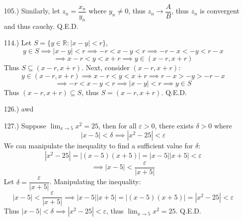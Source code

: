 \documentclass[12pt]{article}
\newcommand{\vertb}[1]{\left\vert#1\right\vert}
\newcommand{\e}{\varepsilon}
\newcommand{\lm}[1]{\displaystyle\lim_{#1}}
\begin{document}
\begin{itemize}
    \item [105.)] Similarly, let $z_n=\dfrac{x_n}{y_n}$ where $y_n\neq0$, thus $z_n\to\dfrac{A}{B}$, thus $z_n$ is convergent and thus cauchy. Q.E.D.








    \item [114.)] Let $S=\{y\in\mathbb{R}:\vertb{x-y}<r\}$,
    \[y\in S\implies\vertb{x-y}<r\implies-r<x-y<r\implies -r-x<-y<r-x\]
    \[\implies x-r<y<x+r\implies y\in(x-r,x+r)\]
    Thus $S\subseteq(x-r,x+r)$. Next, consider $(x-r,x+r)$:
    \[y\in(x-r,x+r)\implies x-r<y<x+r\implies r-x>-y>-r-x\]
    \[\implies -r<x-y<r\implies\vertb{x-y}<r\implies y\in S\]
    Thus $(x-r,x+r)\subseteq S$, thus $S=(x-r,x+r)$. Q.E.D.







    \pagebreak
    \item [126.)] awd

    \item [127.)] Suppose $\lm{x\to5}x^2=25$, then for all $\e>0$, there exists $\delta>0$ where
    \[\vertb{x-5}<\delta\implies\vertb{x^2-25}<\e\]
    We can manipulate the inequality to find a sufficient value for $\delta$:
    \[\vertb{x^2-25}=\vertb{(x-5)(x+5)}=\vertb{x-5}\vertb{x+5}<\e\]
    \[\implies\vertb{x-5}<\frac{\e}{\vertb{x+5}}\]
    Let $\delta=\dfrac{\e}{\vertb{x+5}}$. Manipulating the inequality:
    \[\vertb{x-5}<\frac{\varepsilon}{\vertb{x+5}}\implies\vertb{x-5}\vertb{x+5}=\vertb{(x-5)(x+5)}=\vertb{x^2-25}<\e\]
    Thus $\vertb{x-5}<\delta\implies\vertb{x^2-25}<\e$, thus $\lm{x\to5}x^2=25$. Q.E.D.


\end{itemize}
\end{document}
